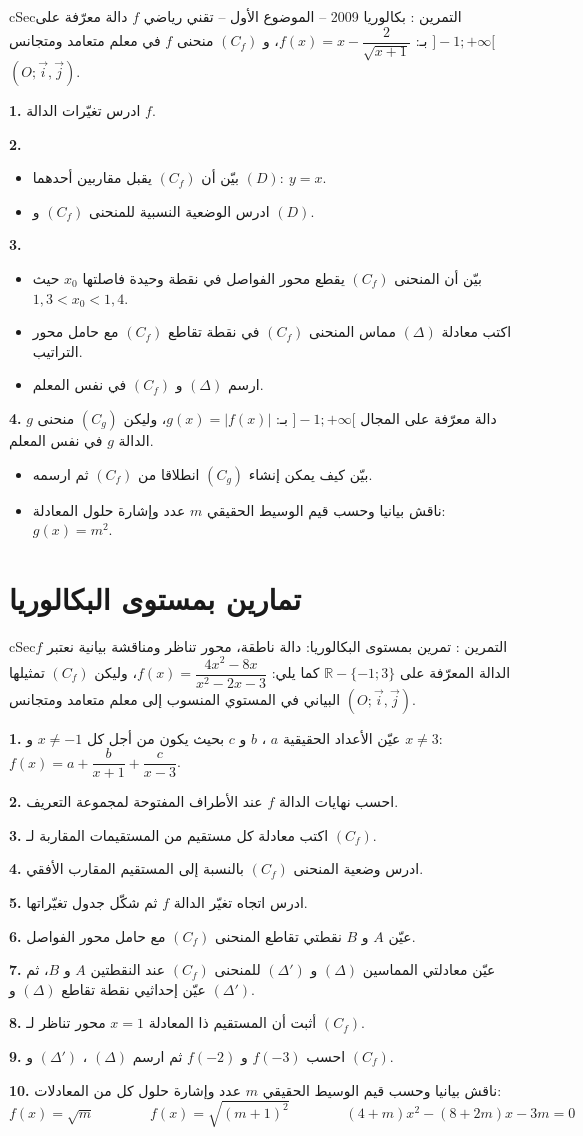 \documentclass[12pt,a4paper]{article}
\newenvironment{BOX}[2]{\begin{otherlanguage}{english}\begin{arbox}{#1}{#2}}{\end{arbox}\end{otherlanguage}}
\newcounter{exo}
\newenvironment{tamrin}[1]{\stepcounter{exo}\begin{BOX}{cSec}{التمرين \theexo: #1}}{\end{BOX}}
\newcommand{\R}{\mathbb{R}}
\newenvironment{sq}{\begin{itemize}[leftmargin=2.4em,itemsep=3pt]}{\end{itemize}}
\newcommand{\qa}{\item[(أ)]}\newcommand{\qb}{\item[(ب)]}\newcommand{\qc}{\item[(جـ)]}\newcommand{\qd}{\item[(د)]}\newcommand{\qe}{\item[(هـ)]}
\newcommand{\QQ}[1]{\par\smallskip\textbf{#1.} }
\begin{document}
\begin{tamrin}{بكالوريا 2009 -- الموضوع الأول -- تقني رياضي}
$f$ دالة معرّفة على $]-1;+\infty[$ بـ: $f(x)=x-\dfrac{2}{\sqrt{x+1}}$، و $(C_f)$ منحنى $f$ في معلم متعامد ومتجانس $(O;\vec i,\vec j)$.
\QQ{1} ادرس تغيّرات الدالة $f$.
\QQ{2}
\begin{sq}
\qa بيّن أن $(C_f)$ يقبل مقاربين أحدهما $(D):\ y=x$.
\qb ادرس الوضعية النسبية للمنحنى $(C_f)$ و $(D)$.
\end{sq}
\QQ{3}
\begin{sq}
\qa بيّن أن المنحنى $(C_f)$ يقطع محور الفواصل في نقطة وحيدة فاصلتها $x_0$ حيث $1{,}3<x_0<1{,}4$.
\qb اكتب معادلة $(\Delta)$ مماس المنحنى $(C_f)$ في نقطة تقاطع $(C_f)$ مع حامل محور التراتيب.
\qc ارسم $(\Delta)$ و $(C_f)$ في نفس المعلم.
\end{sq}
\QQ{4} $g$ دالة معرّفة على المجال $]-1;+\infty[$ بـ: $g(x)=|f(x)|$، وليكن $(C_g)$ منحنى الدالة $g$ في نفس المعلم.
\begin{sq}
\qa بيّن كيف يمكن إنشاء $(C_g)$ انطلاقا من $(C_f)$ ثم ارسمه.
\qb ناقش بيانيا وحسب قيم الوسيط الحقيقي $m$ عدد وإشارة حلول المعادلة: $g(x)=m^{2}$.
\end{sq}
\end{tamrin}

\section{تمارين بمستوى البكالوريا}
\begin{tamrin}{تمرين بمستوى البكالوريا: دالة ناطقة، محور تناظر ومناقشة بيانية}
نعتبر $f$ الدالة المعرّفة على $\R-\{-1;3\}$ كما يلي: $f(x)=\dfrac{4x^{2}-8x}{x^{2}-2x-3}$، وليكن $(C_f)$ تمثيلها البياني في المستوي المنسوب إلى معلم متعامد ومتجانس $(O;\vec i,\vec j)$.
\QQ{1} عيّن الأعداد الحقيقية $a$ ، $b$ و $c$ بحيث يكون من أجل كل $x\neq-1$ و $x\neq3$: \ $f(x)=a+\dfrac{b}{x+1}+\dfrac{c}{x-3}$.
\QQ{2} احسب نهايات الدالة $f$ عند الأطراف المفتوحة لمجموعة التعريف.
\QQ{3} اكتب معادلة كل مستقيم من المستقيمات المقاربة لـ $(C_f)$.
\QQ{4} ادرس وضعية المنحنى $(C_f)$ بالنسبة إلى المستقيم المقارب الأفقي.
\QQ{5} ادرس اتجاه تغيّر الدالة $f$ ثم شكّل جدول تغيّراتها.
\QQ{6} عيّن $A$ و $B$ نقطتي تقاطع المنحنى $(C_f)$ مع حامل محور الفواصل.
\QQ{7} عيّن معادلتي المماسين $(\Delta)$ و $(\Delta')$ للمنحنى $(C_f)$ عند النقطتين $A$ و $B$، ثم عيّن إحداثيي نقطة تقاطع $(\Delta)$ و $(\Delta')$.
\QQ{8} أثبت أن المستقيم ذا المعادلة $x=1$ محور تناظر لـ $(C_f)$.
\QQ{9} احسب $f(-3)$ و $f(-2)$ ثم ارسم $(\Delta)$ ، $(\Delta')$ و $(C_f)$.
\QQ{10} ناقش بيانيا وحسب قيم الوسيط الحقيقي $m$ عدد وإشارة حلول كل من المعادلات:
\[f(x)=\sqrt{m}\qquad\qquad f(x)=\sqrt{(m+1)^{2}}\qquad\qquad (4+m)x^{2}-(8+2m)x-3m=0\]
\end{tamrin}
\end{document}

